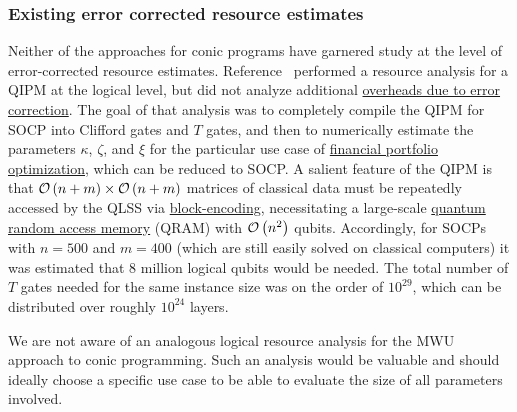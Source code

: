\begin{refsection}
\subsubsection*{Existing error corrected resource estimates}
Neither of the approaches for conic programs have garnered study at the level of error-corrected resource estimates. Reference~\cite{dalzell2022socp} performed a resource analysis for a QIPM at the logical level, but did not analyze additional \hyperref[prim:FTQC]{overheads due to error correction}. The goal of that analysis was to completely compile the QIPM for SOCP into Clifford gates and $T$ gates, and then to numerically estimate the parameters $\kappa$, $\zeta$, and $\xi$ for the particular use case of \hyperref[appl:PortfolioOptimization]{financial portfolio optimization}, which can be reduced to SOCP. A salient feature of the QIPM is that $\mathcal{O}\left( n+m \right) \times \mathcal{O}\left( n+m \right)$ matrices of classical data must be repeatedly accessed by the QLSS via \hyperref[prim:BlockEncodings]{block-encoding}, necessitating a large-scale \hyperref[prim:QRAM]{quantum random access memory} (QRAM) with $\mathcal{O}\left( n^2 \right)$ qubits. Accordingly, for SOCPs with $n=500$ and $m=400$ (which are still easily solved on classical computers) it was estimated that 8 million logical qubits would be needed. The total number of $T$ gates needed for the same instance size was on the order of $10^{29}$, which can be distributed over roughly $10^{24}$ layers.


We are not aware of an analogous logical resource analysis for the MWU approach to conic programming. Such an analysis would be valuable and should ideally choose a specific use case to be able to evaluate the size of all parameters involved. 


\end{refsection}

